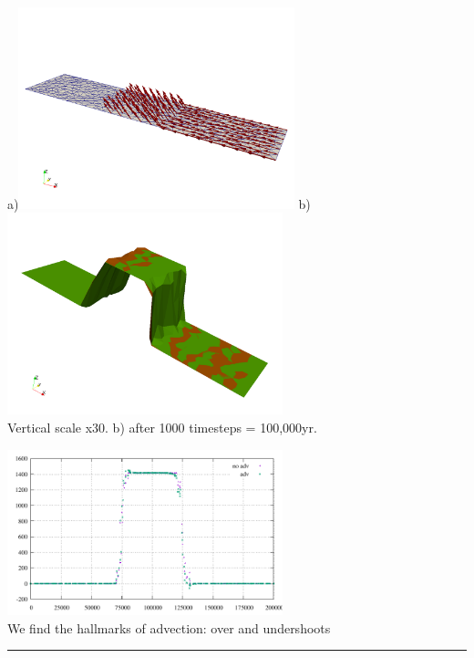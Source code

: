 \begin{center}
a)\includegraphics[width=8cm]{python_codes/fieldstone_140/results/exp6/uplift}
b)\includegraphics[width=8cm]{python_codes/fieldstone_140/results/exp6/elevation.png}\\
{\captionfont Vertical scale x30. b) after 1000 timesteps = 100,000yr.}
\end{center}

\begin{center}
\includegraphics[width=8cm]{python_codes/fieldstone_140/results/exp6/elevation.pdf}\\
{\captionfont We find the hallmarks of advection: over and undershoots}
\end{center}








\par\noindent\rule{\textwidth}{0.4pt}


